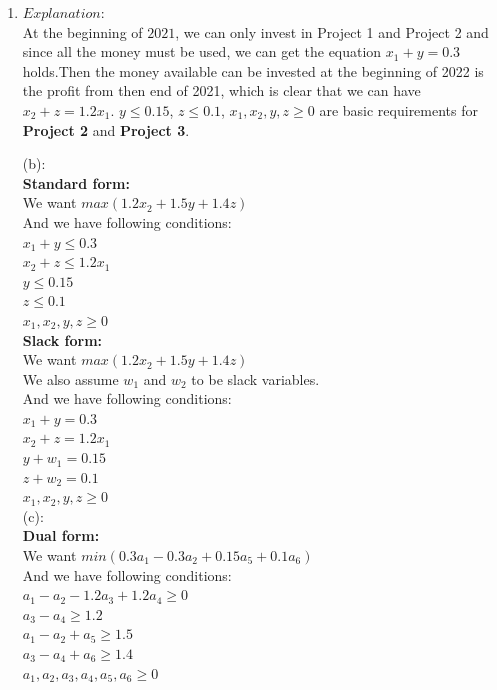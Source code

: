 \documentclass[12pt,a4paper]{article}
\makeatletter
\newtheorem*{solution}{Solution}
\theoremstyle{definition}
\renewenvironment{solution}[1][Solution] {\par\pushQED{\qed}\normalfont\topsep6\p@\@plus6\p@\relax\trivlist\item[\hskip\labelsep\bfseries#1\@addpunct{.}]\ignorespaces}{\popQED\endtrivlist\@endpefalse} \makeatother
\makeatother
\begin{document}
\begin{enumerate}
\begin{solution}
    $Explanation: $\\    
    At the beginning of $2021$, we can only invest in Project 1 and Project 2 and since all the
    money must be used, we can get the equation $x_1 + y = 0.3$ holds.Then the money available can be invested at the beginning of 2022 is the profit from then end of 2021, which is clear that we can have  $x_2+z = 1.2x_1$.     $y \leq 0.15$, $z \leq 0.1$, $x_1,x_2,y,z \ge 0$ are basic requirements for \textbf{Project 2} and \textbf{Project 3}.
    
    (b):\\
    \textbf{Standard form: }\\
    We want $max\left(1.2x_2+1.5y+1.4z\right)$\\
    And we have following conditions: \\
    $x_1+y \leq 0.3$\\
    $x_2+z \leq 1.2x_1$\\
    $y \leq 0.15$\\
    $z \leq 0.1$\\
    $x_1,x_2,y,z \ge 0$\\
    
    \textbf{Slack form: }\\
    We want $max\left(1.2x_2+1.5y+1.4z\right)$\\
    We also assume $w_1$ and $w_2$ to be slack variables.\\
    And we have following conditions: \\
    $x_1+y = 0.3$\\
    $x_2+z = 1.2x_1$\\
    $y + w_1 = 0.15$\\
    $z + w_2 = 0.1$\\
    $x_1,x_2,y,z \ge 0$\\
    
    
    (c):\\
    \textbf{Dual form: }\\
    We want $min\left(0.3a_1-0.3a_2+0.15a_5+0.1a_6\right)$\\
    And we have following conditions: \\
    $a_1-a_2-1.2a_3+1.2a_4 \ge 0$\\
    $a_3-a_4 \ge 1.2$\\
    $a_1-a_2+a_5 \ge 1.5$\\
    $a_3-a_4+a_6 \ge 1.4$\\
    $a_1,a_2,a_3,a_4,a_5,a_6 \ge 0$\\
    

\end{solution}
\end{enumerate}
\end{document}
